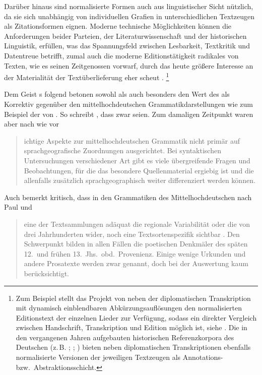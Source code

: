 Darüber hinaus sind normalisierte Formen auch aus
linguistischer Sicht nützlich, da sie sich unabhängig von individuellen Grafien
in unterschiedlichen Textzeugen als Zitations\-formen eignen. Moderne
technische Möglich\-keiten können die Anforderungen beider Parteien, der
Literaturwissenschaft und der historischen
Linguistik, erfüllen, was das Spannungsfeld zwischen
Lesbarkeit, Textkritik und Datentreue betrifft, zumal auch die moderne
Editionstätigkeit radikales  von Texten,
wie \citeauthor{wilhelm1932} es seinen Zeitgenossen vorwarf, durch das heute
größere Interesse an der Materialität der Textüberlieferung eher scheut
\autocite[vgl.][1306]{wegera2000}.%
%
	\footnote{Zum Beispiel stellt das Projekt  von
	\citet{ldmdigital} neben der diplomatischen Transkription mit dynamisch
	einblendbaren Abkürzungsauflösungen den normalisierten
	Editionstext der einzelnen Lieder zur Verfügung,
	sodass ein direkter Vergleich zwischen Handschrift, Transkription und
	Edition möglich ist, siehe . Die in den vergangenen
	Jahren aufgebauten historischen Referenzkorpora des
	Deutschen (z.\,B. \cite[vgl.][522--523]{dipper2015};
	\cite{rem}; \cite{ddd}) bieten neben diplomatischen Transkriptionen
	ebenfalls normalisierte Versionen der jeweiligen Textzeugen als
	Annotations- bzw.\ Abstraktionsschicht.}

Dem Geist \citeauthor{wilhelm1932}s folgend betonen sowohl \citet{deboor1976}
als auch \citet{schulze2011} besonders den Wert des \CAO{} als Korrektiv
gegenüber den mittelhochdeutschen
Grammatik\-darstel\-lungen wie zum Beispiel der von \citet{paul2007}. So
schreibt \citet[22]{schulze2011}, dass zwar  seien. Zum damaligen Zeitpunkt waren aber nach wie vor
\blockcquote[22]{schulze2011}{ichtige Aspekte zur
mittelhochdeutschen Grammatik \textelp{} nicht primär auf
sprachgeografische Zuordnungen ausgerichtet. Bei
syntaktischen Untersuchungen verschiedener Art gibt es viele übergreifende
Fragen und Beobachtungen, für die das besondere Quellenmaterial ergiebig ist
und die allenfalls zusätzlich sprachgeographisch weiter
differenziert werden können.}

Auch \citet{wegera2000} bemerkt kritisch, dass in den Grammatiken des
Mittelhochdeutschen nach Paul\nocite{paul2007} und
\citeauthor{mettke1993} \blockcquote[1305]{wegera2000}{eine der
Textsammlungen adäquat die regionale Variabilität oder die  von
drei Jahrhunderten wider, noch \textelp{} eine
Textsortenspezifik sichtbar . Den Schwerpunkt bilden in allen
Fällen die poetischen Denkmäler des späten 12.\ und frühen 13.~Jhs.\ obd.\
Provenienz. Einige wenige Urkunden und andere Prosatexte \textelp{}
werden zwar genannt, doch bei der Auswertung kaum berücksichtigt.}

